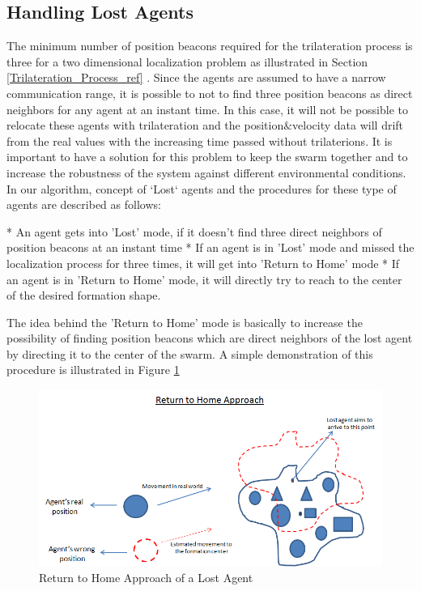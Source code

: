 \subsection{Handling Lost Agents} \label{LostAgents}
The minimum number of position beacons required for the trilateration process is three for a two dimensional localization problem as illustrated in Section \ref{Trilateration_Process_ref} . Since the agents are assumed to have a narrow communication range, it is possible to not to find three  position beacons as direct neighbors for any agent at an instant time. In this case, it will not be possible to relocate these agents with trilateration and the position$\&$velocity data will drift from the real values with the increasing time passed without trilaterions. It is important to have a solution for this problem to keep the swarm together and to increase the robustness of the system against different environmental conditions. In our algorithm, concept of `Lost` agents and the procedures for these type of agents are described as follows:
	
	* An agent gets into 'Lost' mode, if it doesn't find three direct neighbors of position beacons at an instant time \newline
	* If an agent is in 'Lost' mode and missed the localization process for three times, it will get into 'Return to Home' mode \newline
	* If an agent is in 'Return to Home' mode, it will directly try to reach to the center of the desired formation shape.
		
The idea behind the 'Return to Home' mode is basically to increase the possibility of finding position beacons which are direct neighbors of the lost agent by directing it to the center of the swarm. A simple demonstration of this procedure is illustrated in Figure \ref{return_home_ref}
	
\begin{figure}[H]
\caption{Return to Home Approach of a Lost Agent} \label{return_home_ref}
\centering
\includegraphics[scale = 0.60]{return_home}
\end{figure}
	

